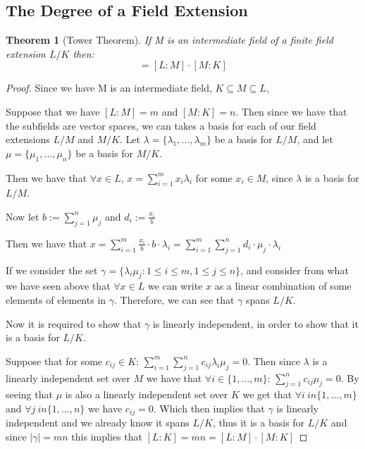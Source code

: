 \documentclass[12pt]{article}
\newtheorem{theorem}{Theorem}
\begin{document}
\subsection{The Degree of a Field Extension}
\begin{theorem}[Tower Theorem] If M is an intermediate field of a finite field extension $L/K$ then:
\begin{equation*}
    [L:K] = [L:M]\cdot[M:K]
\end{equation*}
\end{theorem}
\begin{proof}
Since we have M is an intermediate field, $K \subseteq M \subseteq L$,

Suppose that we have $[L:M]=m$ and $[M:K]=n$. Then since we have that the subfields are vector spaces, we can takes a basis for each of our field extensions $L/M$ and $M/K$.
Let $\lambda = \{\lambda_1,...,\lambda_m\}$ be a basis for $L/M$, and let $\mu = \{\mu_1,...,\mu_n\}$ be a basis for $M/K$.

\noindent Then we have that $\forall x \in L$, $x = \sum^m_{i=1}x_i\lambda_i$ for some $x_i \in M$, since $\lambda$ is a basis for $L/M$.

\noindent Now let $b:=\sum^n_{j=1}\mu_j$ and $d_i:=\frac{x_i}{b}$

\noindent Then we have that $x=\sum^m_{i=1}\frac{x_i}{b}\cdot b \cdot \lambda_i = \sum^m_{i=1}\sum^n_{j=1}d_i\cdot \mu_j \cdot \lambda_i$

\noindent If we consider the set $\gamma=\{\lambda_i\mu_j : 1\leq i \leq m, 1\leq j \leq n\}$, and consider from what we have seen above that $\forall x \in L$ we can write $x$ as a linear combination of some elements of elements in $\gamma$. Therefore, we can see that $\gamma$ spans $L/K$.

Now it is required to show that $\gamma$ is linearly independent, in order to show that it is a basis for $L/K$.

Suppose that for some $c_{ij} \in K$: $\sum^m_{i=1} \sum^n_{j=1} c_{ij}\lambda_i\mu_j = 0 $. Then since $\lambda$ is a linearly independent set over $M$ we have that $\forall i \in \{1,...,m\}$:\hspace{0.2cm} $\sum^n_{j=1} c_{ij}\mu_j = 0 $. By seeing that $\mu$ is also a linearly independent set over $K$ we get that $\forall i \ in \{1,...,m\}$ and $\forall j \ in \{1,...,n\}$ we have $c_{ij} = 0$. Which then implies that $\gamma$ is linearly independent and we already know it spans $L/K$, thus it is a basis for $L/K$ and since $|\gamma|=mn$ this implies that $[L:K] = mn = [L:M]\cdot[M:K]$

\end{proof}
\end{document}
